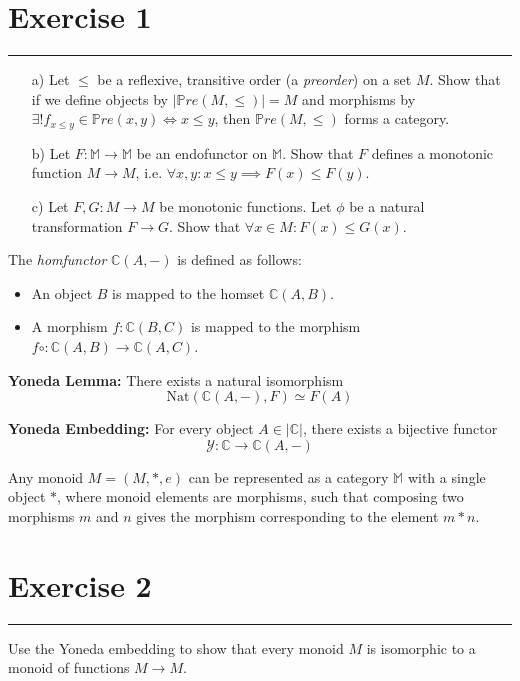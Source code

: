 \documentclass{article}
\newcommand{\seperator}{\vspace{-8pt}\hrule\vspace{8pt}}
\newcommand{\bC}{\mathbb{C}}
\newcommand{\bM}{\mathbb{M}}
\newcommand{\bPre}{\mathbb{P}re}
\newcommand{\nat}{\text{Nat}}
\newcommand{\mY}{\mathcal{Y}}
\begin{document}
\section*{Exercise 1}
\seperator
\begin{itemize}
	\item[a)] Let $\leq$ be a reflexive, transitive order (a \textit{preorder}) on a set $M$. Show that if we define objects by $|\bPre(M, \leq)| = M$ and morphisms by $\exists! f_{x \leq y} \in \bPre(x,y) \Leftrightarrow x \leq y$, then $\bPre(M, \leq)$ forms a category.
	\item[b)] Let $F : \bM \to \bM$ be an endofunctor on $\bM$. Show that $F$ defines a monotonic function $M \to M$, i.e. $\forall x,y : x \leq y \implies F(x) \leq F(y)$.
	\item[c)] Let $F,G : M \to M$ be monotonic functions. Let $\phi$ be a natural transformation $F \to G$. Show that $\forall x \in M: F(x) \leq G(x)$.
\end{itemize}
%
%
%
%
%
\clearpage
%
%
%
%
%
\begin{definition}
	The \textit{homfunctor} $\bC(A, -)$ is defined as follows:
	\begin{itemize}
		\item An object $B$ is mapped to the homset $\bC(A,B)$.
		\item A morphism $f : \bC(B,C)$ is mapped to the morphism $f \circ : \bC(A,B) \to \bC(A,C)$.
	\end{itemize}
\end{definition}
\begin{definition}
	\textbf{Yoneda Lemma:} There exists a natural isomorphism 
	\[\nat(\bC(A,-), F) \simeq F(A)\]
\end{definition}
\begin{definition}
	\textbf{Yoneda Embedding:} For every object $A \in |\bC|$, there exists a bijective functor \[\mY : \bC \to \bC(A,-)\]
\end{definition}
\begin{proposition}
	Any monoid $M = (M, *, e)$ can be represented as a category $\bM$ with a single object $*$, where monoid elements are morphisms, such that composing two morphisms $m$ and $n$ gives the morphism corresponding to the element $m * n$.
\end{proposition}
\section*{Exercise 2}
\seperator
Use the Yoneda embedding to show that every monoid $M$ is isomorphic to a monoid of functions $M \to M$. 
\end{document}
